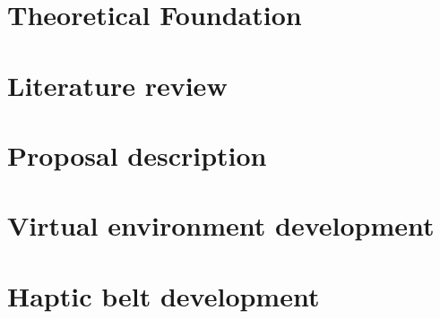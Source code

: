 \documentclass[msc, dv, eng]{ita}    %
\begin{document}
\chapter{Theoretical Foundation}
\label{ch:fundamentacao}


\chapter{Literature review}
\label{ch:revisao}


\chapter{Proposal description}
\label{ch:metodologia}


\chapter{Virtual environment development}
\label{ch:cenario}


\chapter{Haptic belt development}
\label{ch:cinto}


%
%
%

\renewcommand\bibname{\itareferencesnamebabel} %
%

\end{document}
